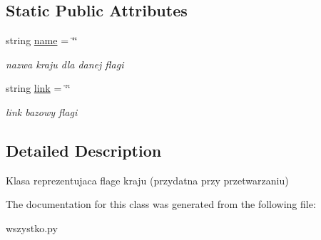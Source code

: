 \subsection*{Static Public Attributes}
\begin{DoxyCompactItemize}
\item 
\hypertarget{classwszystko_1_1_flag_a8ccf841cb59e451791bcb2e1ac4f1edc}{string \hyperlink{classwszystko_1_1_flag_a8ccf841cb59e451791bcb2e1ac4f1edc}{name} = \char`\"{}\char`\"{}}\label{classwszystko_1_1_flag_a8ccf841cb59e451791bcb2e1ac4f1edc}

\begin{DoxyCompactList}\small\item\em nazwa kraju dla danej flagi \end{DoxyCompactList}\item 
\hypertarget{classwszystko_1_1_flag_a4c3294af3eec6db147458883369c6391}{string \hyperlink{classwszystko_1_1_flag_a4c3294af3eec6db147458883369c6391}{link} = \char`\"{}\char`\"{}}\label{classwszystko_1_1_flag_a4c3294af3eec6db147458883369c6391}

\begin{DoxyCompactList}\small\item\em link bazowy flagi \end{DoxyCompactList}\end{DoxyCompactItemize}


\subsection{Detailed Description}
Klasa reprezentujaca flage kraju (przydatna przy przetwarzaniu) 

The documentation for this class was generated from the following file\-:\begin{DoxyCompactItemize}
\item 
wszystko.\-py\end{DoxyCompactItemize}
